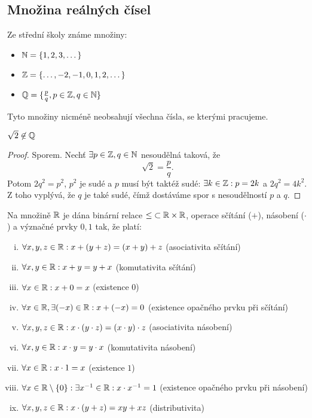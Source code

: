 \subsection{Množina reálných čísel}

Ze střední školy známe množiny:
\begin{itemize}
    \item $\mathbb{N} = \{1, 2, 3, \dots \}$
    \item $\mathbb{Z} = \{\dots, -2, -1, 0, 1, 2, \dots \}$
    \item $\mathbb{Q} = \{\frac{p}{q}, p \in \mathbb{Z}, q \in \mathbb{N} \}$
\end{itemize}

Tyto množiny nicméně neobsahují všechna čísla, se kterými pracujeme.

\begin{theorem}
    \leavevmode
    $\sqrt{2} \not \in \mathbb{Q}$
\end{theorem}

\begin{proof}
    Sporem. Nechť $\exists p \in \mathbb{Z}, q \in \mathbb{N}$ nesoudělná taková, že
    $$\sqrt{2} = \frac{p}{q}.$$
    Potom $2q^2 = p^2$, $p^2$ je sudé a $p$ musí být taktéž sudé: $\exists
    k \in \mathbb{Z}: p = 2k$ a $2q^2 = 4k^2$. Z toho vyplývá, že $q$ je také sudé, 
    čímž dostáváme spor s nesoudělností $p$ a $q$.
\end{proof}

\begin{remark}
    Na množině $\mathbb{R}$ je dána binární relace $\leq \; \subset \mathbb{R} \times \mathbb{R}$, operace 
    sčítání ($+$), násobení ($\cdot$) a význačné prvky $0, 1$ tak, že 
    platí:
    \begin{enumerate}[i.]
        \item $\forall x,y,z \in \mathbb{R}: x + (y + z) = (x + y) + z$ (asociativita
            sčítání)
        \item $\forall x,y \in \mathbb{R}: x + y = y + x$ (komutativita sčítání)
        \item $\forall x \in \mathbb{R}: x + 0 = x$ (existence $0$)
        \item $\forall x \in \mathbb{R}, \exists (-x) \in \mathbb{R}: x + (-x) = 0$ (existence
            opačného prvku při sčítání)
        \item $\forall x,y,z \in \mathbb{R}: x\cdot(y\cdot z) = (x \cdot y) \cdot z$
            (asociativita násobení)
        \item $\forall x,y \in \mathbb{R}: x\cdot y = y \cdot x$ (komutativita 
            násobení)
        \item $\forall x \in \mathbb{R}: x \cdot 1 = x$ (existence $1$)
        \item $\forall x \in \mathbb{R} \setminus \{0\}: \exists x^{-1} \in \mathbb{R}: x \cdot
            x^{-1} = 1$ (existence opačného prvku při násobení)
        \item $\forall x,y,z \in \mathbb{R}: x \cdot (y + z) = xy + xz$ 
            (distributivita)
    \end{enumerate}
\end{remark}

